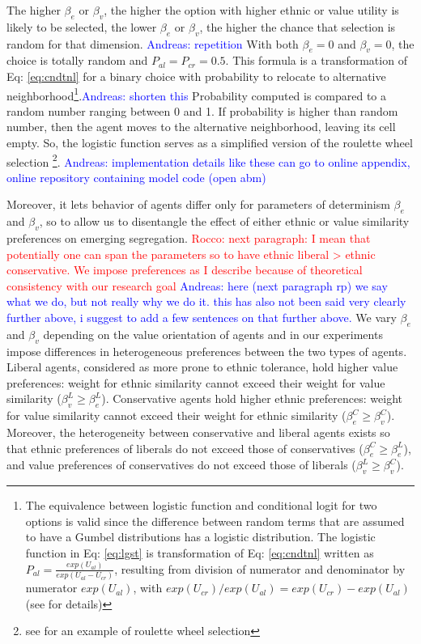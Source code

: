 \documentclass[
]{article}
\begin{document}
The higher \(\beta_e\) or \(\beta_v\), the higher the option with higher
ethnic or value utility is likely to be selected, the lower \(\beta_e\)
or \(\beta_v\), the higher the chance that selection is random for that
dimension. \textcolor{blue}{{Andreas: }repetition} With both
\(\beta_e = 0\) and \(\beta_v = 0\), the choice is totally random and
\(P_{al} = P_{cr} = 0.5\). This formula is a transformation of Eq:
\ref{eq:cndtnl} for a binary choice with probability to relocate to
alternative
neighborhood\footnote{The equivalence between logistic function  and conditional logit for two options is valid since the difference between random terms that are assumed to have a Gumbel distributions has a logistic distribution.
The logistic function in Eq: \ref{eq:lgst} is transformation of Eq: \ref{eq:cndtnl} written as $P_{al} = \frac{exp(U_{al})}{exp(U_{al}-U_{cr})}$, resulting from division of numerator and denominator by numerator $exp(U_{al})$, with $exp(U_{cr})/exp(U_{al}) = exp(U_{cr}) - exp(U_{al})$ (see \cite[p.39]{train2009discrete} for details)}.\textcolor{blue}{{Andreas: }shorten this}
Probability computed is compared to a random number ranging between 0
and 1. If probability is higher than random number, then the agent moves
to the alternative neighborhood, leaving its cell empty. So, the
logistic function serves as a simplified version of the roulette wheel
selection
\footnote{see \cite{bruch2012methodological} for an example of roulette wheel selection}.
\textcolor{blue}{{Andreas: }implementation details like these can go to online appendix, online repository containing model code (open abm)}

Moreover, it lets behavior of agents differ only for parameters of
determinism \(\beta_e\) and \(\beta_v\), so to allow us to disentangle
the effect of either ethnic or value similarity preferences on emerging
segregation.
{\textcolor{red}{Rocco: next paragraph: I mean that potentially one can span the parameters so to have ethnic liberal > ethnic conservative.
We impose preferences as I describe because of theoretical consistency with our research goal}}
\textcolor{blue}{{Andreas: }here (next paragraph rp) we say what we do, but not really why we do it. this has also not been said very clearly further above, i suggest to add a few sentences on that further above.}
We vary \(\beta_e\) and \(\beta_v\) depending on the value orientation
of agents and in our experiments impose differences in heterogeneous
preferences between the two types of agents. Liberal agents, considered
as more prone to ethnic tolerance, hold higher value preferences: weight
for ethnic similarity cannot exceed their weight for value similarity
(\(\beta^{L}_v \geq \beta^{L}_e\)). Conservative agents hold higher
ethnic preferences: weight for value similarity cannot exceed their
weight for ethnic similarity (\(\beta^{C}_e \geq \beta^{C}_v\)).
Moreover, the heterogeneity between conservative and liberal agents
exists so that ethnic preferences of liberals do not exceed those of
conservatives (\(\beta^{C}_e \geq \beta^{L}_e\)), and value preferences
of conservatives do not exceed those of liberals
(\(\beta^{L}_v \geq \beta^{C}_v\)).
\end{document}
